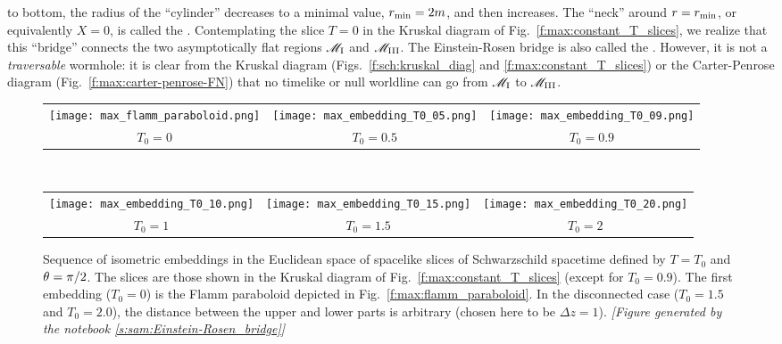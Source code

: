to bottom, the radius of the ``cylinder'' decreases to a minimal value, $r_{\rm min}=2m$,
and then increases. The ``neck'' around $r=r_{\rm min}$, or equivalently $X=0$, is called the
 \cite{EinstR35}.
Contemplating the slice $T=0$ in the
Kruskal diagram of Fig.~\ref{f:max:constant_T_slices}, we realize that
this ``bridge'' connects the two asymptotically flat regions $\mathscr{M}_{\rm I}$ and
$\mathscr{M}_{\rm III}$. The Einstein-Rosen bridge is also called
the . However, it is not
a \emph{traversable} wormhole: it is clear from the Kruskal diagram
(Figs.~\ref{f:sch:kruskal_diag} and \ref{f:max:constant_T_slices})
or the Carter-Penrose diagram (Fig.~\ref{f:max:carter-penrose-FN}) that no
timelike or null worldline can go from $\mathscr{M}_{\rm I}$ to
$\mathscr{M}_{\rm III}$.

\begin{figure}
\begin{center}
\begin{tabular}{ccc}
\texttt{[image: max\_flamm\_paraboloid.png]} &
\texttt{[image: max\_embedding\_T0\_05.png]} &
\texttt{[image: max\_embedding\_T0\_09.png]} \\
$T_0=0$ & $T_0=0.5$ & $T_0=0.9$
\end{tabular} \\
\begin{tabular}{ccc}
\texttt{[image: max\_embedding\_T0\_10.png]} &
\texttt{[image: max\_embedding\_T0\_15.png]} &
\texttt{[image: max\_embedding\_T0\_20.png]} \\
$T_0=1$ & $T_0=1.5$ & $T_0=2$
\end{tabular}
\end{center}
\caption[]{\label{f:max:embeddings} \footnotesize
Sequence of isometric embeddings in the Euclidean space
of spacelike slices of Schwarzschild spacetime defined by
$T=T_0$ and $\theta=\pi/2$. The slices are those shown in the Kruskal diagram
of Fig.~\ref{f:max:constant_T_slices} (except for $T_0=0.9$).
The first embedding ($T_0=0$) is the
Flamm paraboloid depicted in Fig.~\ref{f:max:flamm_paraboloid}.
In the disconnected case ($T_0=1.5$ and $T_0=2.0$),
the distance
between the upper and lower parts is arbitrary (chosen here to be $\Delta z = 1$).
\textsl{[Figure generated by the notebook \ref{s:sam:Einstein-Rosen_bridge}]}
}
\end{figure}

